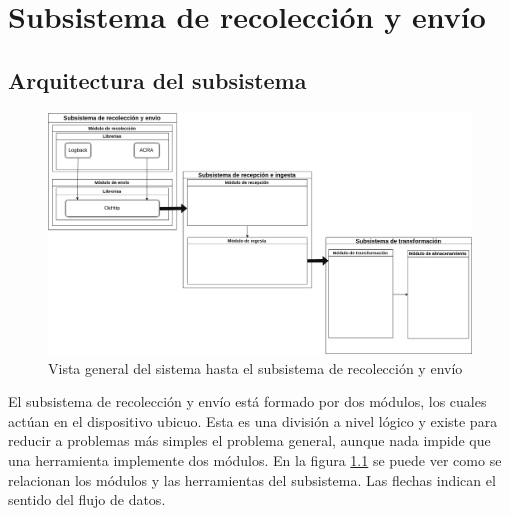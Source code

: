 \chapter{Subsistema de recolección y envío}

\section{Arquitectura del subsistema}

\begin{figure}[!htb]
	\includegraphics[width=\linewidth]{Moduloss-subrecenv.png}
	\caption{Vista general del sistema hasta el subsistema de recolección y envío}
	\label{fig:subrecenv}
\end{figure}

El subsistema de recolección y envío está formado por dos módulos, los cuales actúan en el dispositivo ubicuo. Esta es una división a nivel lógico y existe para reducir a problemas más simples el problema general, aunque nada impide que una herramienta implemente dos módulos. En la figura \ref{fig:subrecenv} se puede ver como se relacionan los módulos y las herramientas del subsistema. Las flechas indican el sentido del flujo de datos.

